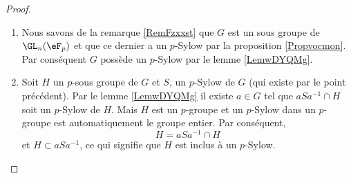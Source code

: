 \begin{proof}


%
%
%
%

    \begin{enumerate}
        \item
            
            Nous savons de la remarque \ref{RemFzxxst} que \( G\) est un sous groupe de \( \GL_n(\eF_p)\) et que ce dernier a un $p$-Sylow par la proposition \ref{Propvocmon}. Par conséquent \( G\) possède un $p$-Sylow par le lemme \ref{LemwDYQMg}.

        \item

            Soit \( H\) un \( p\)-sous groupe de \( G\) et \( S\), un $p$-Sylow de \( G\) (qui existe par le point précédent). Par le lemme \ref{LemwDYQMg} il existe \( a\in G\) tel que \( aSa^{-1}\cap H\) soit un $p$-Sylow de \( H\). Mais \( H\) est un \(p\)-groupe et un $p$-Sylow dans un \( p\)-groupe est automatiquement le groupe entier. Par conséquent,
            \begin{equation}
                H=aSa^{-1}\cap H
            \end{equation}
            et \( H\subset aSa^{-1}\), ce qui signifie que \( H\) est inclus à un $p$-Sylow.


\end{enumerate}
\end{proof}

